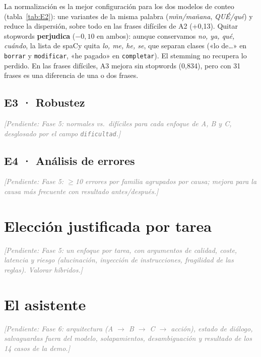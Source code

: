 \documentclass[10pt,a4paper]{article}
\newcommand{\cod}[1]{\texttt{#1}}
\newcommand{\pendiente}[1]{\textcolor{gray}{\textit{[Pendiente: #1]}}}
\begin{document}
La normalización es la mejor configuración para los dos modelos de conteo (tabla~\ref{tab:E2}): une variantes de la misma palabra (\textit{mñn/mañana}, \textit{QUÉ/qué}) y reduce la dispersión, sobre todo en las frases difíciles de A2 (+0,13). Quitar stopwords \textbf{perjudica} ($-0{,}10$ en ambos): aunque conservamos \textit{no, ya, qué, cuándo}, la lista de spaCy quita \textit{lo, me, he, se}, que separan clases («lo de\dots» en \cod{borrar} y \cod{modificar}, «he pagado» en \cod{completar}). El stemming no recupera lo perdido. En las frases difíciles, A3 mejora sin stopwords (0,834), pero con 31 frases es una diferencia de una o dos frases.

\subsection{E3 · Robustez}
\pendiente{Fase 5: normales vs.\ difíciles para cada enfoque de A, B y C, desglosado por el campo \cod{dificultad}.}

\subsection{E4 · Análisis de errores}
\pendiente{Fase 5: $\geq$10 errores por familia agrupados por causa; mejora para la causa más frecuente con resultado antes/después.}

\section{Elección justificada por tarea}\label{sec:eleccion}

\pendiente{Fase 5: un enfoque por tarea, con argumentos de calidad, coste, latencia y riesgo (alucinación, inyección de instrucciones, fragilidad de las reglas). Valorar híbridos.}

\section{El asistente}\label{sec:asistente}

\pendiente{Fase 6: arquitectura (A $\rightarrow$ B $\rightarrow$ C $\rightarrow$ acción), estado de diálogo, salvaguardas fuera del modelo, solapamientos, desambiguación y resultado de los 14 casos de la demo.}
\end{document}
